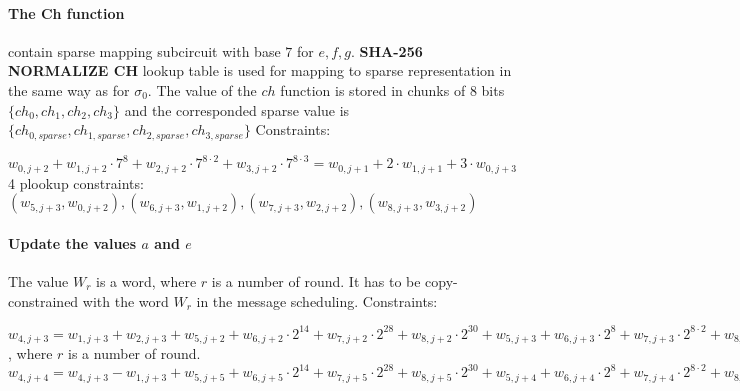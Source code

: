 \paragraph{The Ch function}
contain sparse mapping subcircuit with base $7$ for $e, f ,g$.
\textbf{SHA-256 NORMALIZE CH} lookup table is used for mapping to sparse representation in the same way as for $\sigma_0$.
The value of the $ ch $ function is stored in chunks of $8$ bits $\{ch_0, ch_1, ch_2, ch_3 \}$ and the corresponded sparse value is $\{ch_{0, sparse}, ch_{1, sparse}, ch_{2, sparse}, ch_{3, sparse} \}$
Constraints:
\begin{center}
    $w_{0, j + 2} + w_{1, j + 2} \cdot 7^8 + w_{2, j + 2} \cdot 7^{8 \cdot 2} + w_{3, j + 2} \cdot 7^{8 \cdot 3} = w_{0, j + 1} + 2 \cdot w_{1, j + 1} + 3 \cdot w_{0, j + 3}$ \\
    4 plookup constraints: $( w_{5, j + 3}, w_{0, j + 2}), ( w_{6, j + 3}, w_{1, j + 2}), (w_{7, j + 3}, w_{2, j + 2}), (w_{8, j + 3}, w_{3, j + 2})$ \\
\end{center}

\paragraph{Update the values $a$ and $e$}
The value $W_r$ is a word, where $r$ is a number of round.
It has to be copy-constrained with the word $W_r$ in the message scheduling.
Constraints:
\begin{center}
    $w_{4, j + 3} = w_{1, j + 3} + w_{2, j + 3} + w_{5, j + 2} + w_{6, j + 2} \cdot 2^{14} + w_{7, j + 2} \cdot  2^{28} + w_{8, j + 2} \cdot 2^{30} + w_{5, j + 3} + w_{6, j + 3} \cdot 2^8 + w_{7, j + 3} \cdot 2^{8 \cdot 2} + w_{8, j + 3} \cdot 2^{8 \cdot 3} + k[r] + w_{3, j + 3}$, where $r$ is a number of round. \\
    $w_{4, j + 4} = w_{4, j + 3} - w_{1, j + 3} + w_{5, j + 5} + w_{6, j + 5} \cdot 2^{14} + w_{7, j + 5} \cdot  2^{28} + w_{8, j + 5} \cdot 2^{30} + w_{5, j + 4} + w_{6, j + 4} \cdot 2^8 + w_{7, j + 4} \cdot 2^{8 \cdot 2} + w_{8, j + 4} \cdot 2^{8 \cdot 3}$
\end{center}

